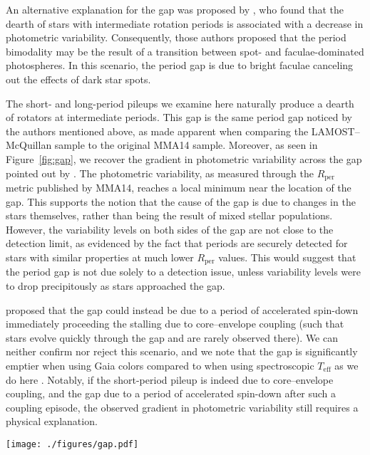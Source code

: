 \documentclass[trackchanges,twocolumn]{aastex631}
\newcommand{\lamostmcq}{LAMOST--McQuillan\xspace}
\newcommand{\mma}{MMA14\xspace}
\newcommand{\teff}{\ensuremath{T_{\mathrm{eff}}}\xspace}
\newcommand{\prot}{\ensuremath{P_\mathrm{rot}}\xspace}
\newcommand{\rper}{\ensuremath{R_\mathrm{per}}\xspace}
\begin{document}
An alternative explanation for the gap was proposed by \citet{Reinhold2019}, who found that the dearth of stars with intermediate rotation periods is associated with a decrease in photometric variability. Consequently, those authors proposed that the period bimodality may be the result of a transition between spot- and faculae-dominated photospheres. In this scenario, the period gap is due to bright faculae canceling out the effects of dark star spots. 

The short- and long-period pileups we examine here naturally produce a dearth of rotators at intermediate periods. This gap is the same period gap noticed by the authors mentioned above, as made apparent when comparing the \lamostmcq sample to the original \mma sample. Moreover, as seen in Figure~\ref{fig:gap}, we recover the gradient in photometric variability across the gap pointed out by \citet{Reinhold2019}. The photometric variability, as measured through the \rper metric published by \mma, reaches a local minimum near the location of the gap. This supports the notion that the cause of the gap is due to changes in the stars themselves, rather than being the result of mixed stellar populations. However, the variability levels on both sides of the gap are not close to the detection limit, as evidenced by the fact that periods are securely detected for stars with similar properties at much lower \rper values. This would suggest that the period gap is not due solely to a detection issue, unless variability levels were to drop precipitously as stars approached the gap. 

\citet{Gordon2021} proposed that the gap could instead be due to a period of accelerated spin-down immediately proceeding the stalling due to core–envelope coupling (such that stars evolve quickly through the gap and are rarely observed there). We can neither confirm nor reject this scenario, and we note that the gap is significantly emptier when using Gaia colors \citep{DavenportCovey2018, Gordon2021} compared to when using spectroscopic \teff as we do here . Notably, if the short-period pileup is indeed due to core–envelope coupling, and the gap due to a period of accelerated spin-down after such a coupling episode, the observed gradient in photometric variability still requires a physical explanation.

\begin{figure*}
    \centering
    \texttt{[image: ./figures/gap.pdf]}
    \caption{The \teff--\prot distribution of the \lamostmcq (left) and \mma samples color coded by the variability amplitude, \rper. Black contours show Gaussian kernel density estimation of the plotted distributions, and the dashed line shows a constant Rossby curve of Ro~=~0.5.
    The long- and short-period pileups are separated by a relative dearth of stars with intermediate rotation periods. A strong gradient in \rper is apparent across this gap, such that variability amplitude reaches a local minimum near the gap's center.}
    \label{fig:gap}
\end{figure*}
\end{document}
